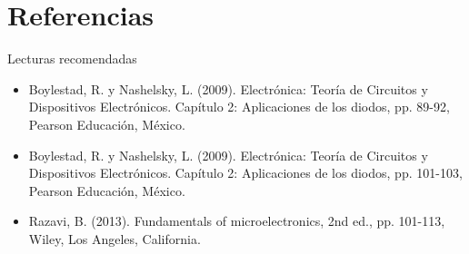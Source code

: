 \documentclass[t,aspectratio=169]{beamer}
\begin{document}
\section{Referencias}
\begin{frame}{Lecturas recomendadas}

\begin{itemize}
    \item Boylestad, R. y Nashelsky, L. (2009). Electrónica: Teoría de Circuitos y Dispositivos Electrónicos. Capítulo 2: Aplicaciones de los diodos, pp. 89-92, Pearson Educación, México.
    \item Boylestad, R. y Nashelsky, L. (2009). Electrónica: Teoría de Circuitos y Dispositivos Electrónicos. Capítulo 2: Aplicaciones de los diodos, pp. 101-103, Pearson Educación, México.
    \item Razavi, B. (2013). Fundamentals of microelectronics, 2nd ed., pp. 101-113, Wiley, Los Angeles, California.
\end{itemize}

\end{frame}
\end{document}
